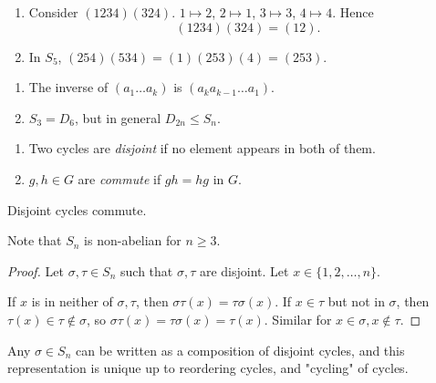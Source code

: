 \documentclass[a4paper]{article}
\newcommand{\bluecomment}[1]{{\color{blue}#1}}
\begin{document}
\begin{example}
  \begin{enumerate}[(1).]
    \item Consider $ (1234)(324) $. $ 1 \mapsto 2 $, $ 2 \mapsto 1 $,
      $ 3 \mapsto 3 $, $4 \mapsto 4 $. Hence
      \[
        (1234)(324)=(12)
      .\]
    \item In $S_5$, $ (254)(534)=(1)(253)(4) = (253) $.
  \end{enumerate}
\end{example}
\begin{remark}
  \begin{enumerate}[(1).]
    \item The inverse of $ (a_1 \dots a_k) $ is $ (a_k a_{k-1}\dots a_1) $.
    \item $ S_3=D_6 $, but in general $ D_{2n}\le S_n $.
  \end{enumerate}
\end{remark}
\begin{definition}
  \begin{enumerate}[(1).]
    \item Two cycles are \textit{disjoint} if no element appears in
      both of them.
    \item $ g,h\in G $ are \textit{commute} if $gh=hg$ in $G$.
  \end{enumerate}
\end{definition}
\begin{lemma}\label{lma:disjoint_cyc_commute}
  Disjoint cycles commute.

  \bluecomment{Note that $S_n$ is non-abelian for $n\ge 3$.}
\end{lemma}
\begin{proof}
  Let $ \sigma, \tau\in S_n $ such that $ \sigma, \tau $ are
  disjoint. Let $ x\in \{1,2,\dots,n\} $.

  If $x$ is in neither of $\sigma, \tau$, then $ \sigma \tau(x)=\tau
  \sigma(x) $. If $ x\in \tau $ but not in $ \sigma $, then $
  \tau(x)\in \tau\notin \sigma $, so $ \sigma \tau(x)=\tau
  \sigma(x)=\tau(x) $. Similar for $ x\in \sigma, x\notin \tau $.
\end{proof}
\begin{theorem}\label{thm:disjoint cycle decomp}
  Any $ \sigma\in S_n $ can be written as a composition of disjoint
  cycles, and this representation is unique up to reordering cycles,
  and "cycling" of cycles.
\end{theorem}
\end{document}
